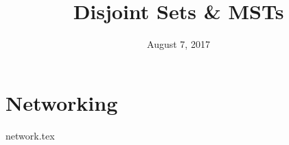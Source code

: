 \documentclass{exam}
\title{Disjoint Sets \& MSTs}
\date{August 7, 2017}
\begin{document}
\maketitle

\section{Networking}
\begin{questions}
{network.tex}
\end{questions}
\end{document}
